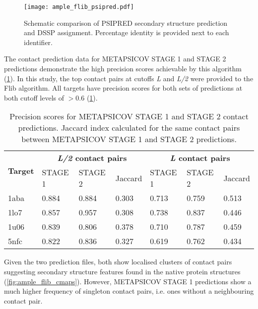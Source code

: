 \begin{figure}[H]
	\centering
	\texttt{[image: ample\_flib\_psipred.pdf]}
	\caption[PSIPRED schema for Flib targets]{Schematic comparison of PSIPRED \cite{Jones1999-fi} secondary structure prediction and DSSP \cite{Frishman1995-ns} assignment. Percentage identity is provided next to each identifier.}
	\label{fig:ample_flib_psipred}
\end{figure}

The contact prediction data for METAPSICOV STAGE 1 and STAGE 2 predictions demonstrate the high precision scores achievable by this algorithm (\cref{table:ample_flib_contact_precision}). In this study, the top contact pairs at cutoffs \textit{L} and \textit{L/2} were provided to the Flib algorithm. All targets have precision scores for both sets of predictions at both cutoff levels of $>0.6$ (\cref{table:ample_flib_contact_precision}).

\begin{table}[H]
  \centering
  \caption[Contact prediction summary for Flib targets]{Precision scores for METAPSICOV \cite{Jones2015-wp} STAGE 1 and STAGE 2 contact predictions. Jaccard index calculated for the same contact pairs between METAPSICOV STAGE 1 and STAGE 2 predictions.}
  \label{table:ample_flib_contact_precision}
  \begin{tabularx}{\textwidth}{X X X X X X X}
      \hline
	  \multirow{2}{*}{\textbf{Target}} & \multicolumn{3}{c}{\textbf{\textit{L/2} contact pairs}} & \multicolumn{3}{c}{\textbf{\textit{L} contact pairs}} 	\\ \cline{2-7}
	  							&  	STAGE 1	& 	STAGE 2	& 	Jaccard 	& 	STAGE 1 	& 	STAGE 2 	& 	Jaccard	 	\\
	  \hline
	  1aba						&	0.884	&	0.884	&	0.303	&	0.713	&	0.759	&	0.513		\\
	  1lo7						&	0.857	&	0.957	&	0.308	&	0.738	&	0.837	&	0.446		\\
	  1u06						&	0.839	&	0.806	&	0.378	&	0.710	&	0.787	&	0.459		\\
	  5nfc						&	0.822	&	0.836	&	0.327	&	0.619	&	0.762	&	0.434		\\ 
	  \hline
  \end{tabularx}
\end{table}

Given the two prediction files, both show localised clusters of contact pairs suggesting
 secondary structure features found in the native protein structures (\cref{fig:ample_flib_cmaps}). However, METAPSICOV STAGE 1 predictions show a much higher frequency of singleton contact pairs, i.e. ones without a neighbouring contact pair.

